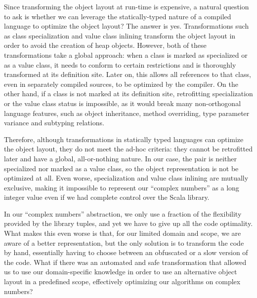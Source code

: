 Since transforming the object layout at run-time is expensive, a natural question to ask is whether we can leverage the statically-typed nature of a compiled language to optimize the object layout? The answer is yes. Transformations such as class specialization and value class inlining transform the object layout in order to avoid the creation of heap objects. However, both of these transformations take a global approach: when a class is marked as specialized or as a value class, it needs to conform to certain restrictions and is thoroughly transformed at its definition site. Later on, this allows all references to that class, even in separately compiled sources, to be optimized by the compiler. On the other hand, if a class is not marked at its definition site, retrofitting specialization or the value class status is impossible, as it would break many non-orthogonal language features, such as object inheritance, method overriding, type parameter variance and subtyping relations. %

Therefore, although transformations in statically typed languages can optimize the object layout, they do not meet the ad-hoc criteria: they cannot be retrofitted later and have a global, all-or-nothing nature. In our case, the pair is neither specialized nor marked as a value class, so the object representation is not be optimized at all. Even worse, specialization and value class inlining are mutually exclusive, making it impossible to represent our ``complex numbers'' as a long integer value even if we had complete control over the Scala library.

In our ``complex numbers'' abstraction, we only use a fraction of the flexibility provided by the library tuples, and yet we have to give up all the code optimality. What makes this even worse is that, for our limited domain and scope, we are aware of a better representation, but the only solution is to transform the code by hand, essentially having to choose between an obfuscated or a slow version of the code. What if there was an automated and safe transformation that allowed us to use our domain-specific knowledge in order to use an alternative object layout in a predefined scope, effectively optimizing our algorithms on complex numbers?

